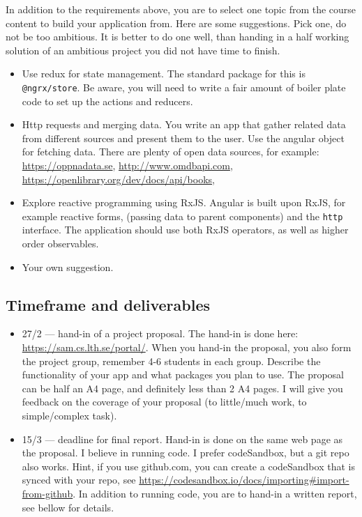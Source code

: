 \documentclass[fleqn, article, a4paper]{memoir}
\begin{document}
\noindent In addition to the requirements above, you are to select one topic from the course content to build your application from. Here are some suggestions. Pick one, do not be too ambitious. It is better to do one well, than handing in a half working solution of an ambitious project you did not have time to finish.
\begin{itemize}
\item Use redux for state management. The standard package for this is \texttt{@ngrx/store}. Be aware, you will need to write a fair amount of boiler plate code to set up the actions and reducers.
\item Http requests and merging data. You write an app that gather related data from different sources and present them to the user. Use the angular  object for fetching data. There are plenty of open data sources, for example: \url{https://oppnadata.se}, \url{http://www.omdbapi.com}, \url{https://openlibrary.org/dev/docs/api/books}, 
\item Explore reactive programming using RxJS. Angular is built upon RxJS, for example reactive forms,  (passing data to parent components) and the \texttt{http} interface. The application should use both RxJS operators, as well as higher order observables.
\item Your own suggestion. 
\end{itemize}

\subsection*{Timeframe and deliverables}

\begin{itemize}
\item 27/2 --- hand-in of a project proposal. The hand-in is done here: \url{https://sam.cs.lth.se/portal/}. When you hand-in the proposal, you also form the project group, remember 4-6 students in each group. Describe the functionality of your app and what packages you plan to use. The proposal can be half an A4 page, and definitely less than 2 A4 pages. I will give you feedback on the coverage of your proposal (to little/much work, to simple/complex task).
\item 15/3 --- deadline for final report. Hand-in is done on the same web page as the proposal. I believe in running code. I prefer codeSandbox, but a git repo also works. Hint, if you use github.com, you can create a codeSandbox that is synced with your repo, see \url{https://codesandbox.io/docs/importing#import-from-github}. In addition to running code, you are to hand-in a written report, see bellow for details.
\end{itemize}
\end{document}
